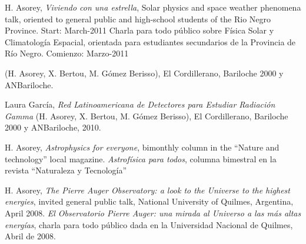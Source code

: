 H. Asorey, {\emph{Viviendo con una estrella}}, 
\ifeng 
Solar physics and space weather phenomena talk, oriented to general public and high-school students of the Rio Negro Province. Start: March-2011
\else
Charla para todo público sobre Física Solar y Climatología Espacial, orientada para estudiantes secundarios de la Provincia de Río Negro. Comienzo: Marzo-2011
\fi

 (H. Asorey, X. Bertou, M. Gómez Berisso), El Cordillerano, Bariloche 2000 y ANBariloche.

Laura García, {\emph{Red Latinoamericana de Detectores para Estudiar Radiación Gamma}} (H. Asorey, X. Bertou, M. Gómez Berisso), El Cordillerano, Bariloche 2000 y ANBariloche, 2010.

H. Asorey, 
\ifeng
{\emph{Astrophysics for everyone}}, bimonthly column in the ``Nature and technology'' local magazine. \else
{\emph{Astrofísica para todos}}, columna bimestral en la revista ``Naturaleza y Tecnología''
\fi

H. Asorey, 
\ifeng
{\emph{The Pierre Auger Observatory: a look to the Universe to the highest energies}}, invited general public talk, National University of Quilmes, Argentina, April 2008.
\else
{\emph{El Observatorio Pierre Auger: una mirada al Universo a las más altas energías}}, charla para todo público dada en la Universidad Nacional de Quilmes, Abril de 2008.
\fi
